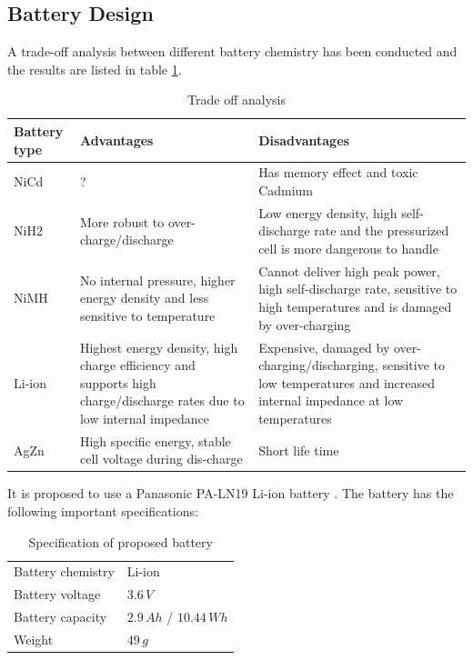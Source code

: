 \subsection{Battery Design}
%
A trade-off analysis between different battery chemistry has been conducted and the results are listed in table \ref{tab:TradeOff_battery}. 
%
%
%
\begin{center}
\begin{table}[H]
\caption{Trade off analysis}
\label{tab:TradeOff_battery}
\begin{tabular}{||p{}p{}p{}||}
\hline
\textbf{Battery type} &  \textbf{Advantages} & \textbf{Disadvantages}\\ 
\hline
NiCd & ? & Has memory effect and toxic Cadmium\\
NiH2 &  More robust to over-charge/discharge & Low energy density, high self-discharge rate and the pressurized cell is more dangerous to handle\\
NiMH & No internal pressure, higher energy density and less sensitive to temperature & Cannot deliver high peak power, high self-discharge rate, sensitive to high temperatures and is damaged by over-charging\\
Li-ion & Highest energy density, high charge efficiency and supports high charge/discharge rates due to low internal impedance & Expensive, damaged by over-charging/discharging, sensitive to low temperatures and increased internal impedance at low temperatures\\
AgZn & High specific energy, stable cell voltage during dis-charge & Short life time\\
\hline
\end{tabular}
\end{table}
\end{center}
%
It is proposed to use a Panasonic PA-LN19 Li-ion battery \cite{Panasonic}. The battery has the following important specifications:
%
\begin{table}[H]
\centering
\caption{Specification of proposed battery}
\label{tab:proposed_battery}
\begin{tabular}{ll}
\hline
Battery chemistry & Li-ion\\
Battery voltage & $3.6\,V$\\
Battery capacity & $2.9\,Ah$ / $10.44\,Wh$\\
Weight & $49\,g$\\
\hline
\end{tabular}
\end{table}
%
